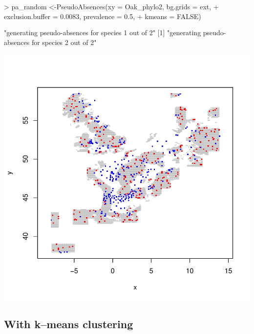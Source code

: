 \documentclass[10pt,a4paper]{report}
\begin{document}
\begin{Schunk}
\begin{Sinput}
> pa_random <-PseudoAbsences(xy = Oak_phylo2, bg.grids = ext, 
+ 	exclusion.buffer = 0.0083, prevalence = 0.5, 
+   kmeans = FALSE)
\end{Sinput}
\begin{Soutput}
[1] "generating pseudo-absences for species 1 out of 2"
[1] "generating pseudo-absences for species 2 out of 2"
\end{Soutput}
\end{Schunk}
\includegraphics{mopa-mopa9}

\subsection{With k--means clustering}
\end{document}
